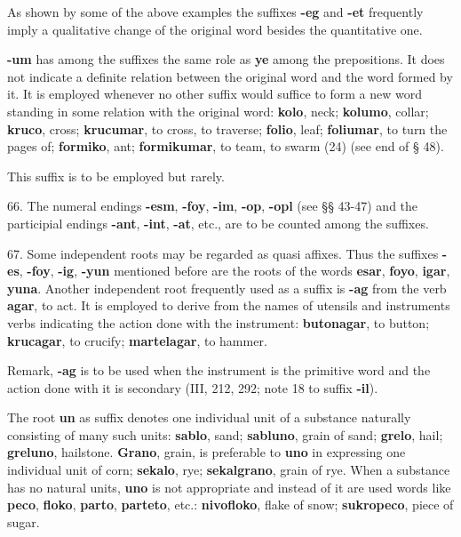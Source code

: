 As shown by some of the above examples the suffixes \textbf{-eg} and \textbf{-et} frequently imply a qualitative change of the original word besides the quantitative one. 

\textbf{-um} has among the suffixes the same role as \textbf{ye} among the prepositions. It does not indicate a definite relation between the original word and the word formed by it. It is employed whenever no other suffix would suffice to form a new word standing in some relation with the original word: \textbf{kolo}, neck; \textbf{kolumo}, collar; \textbf{kruco}, cross; \textbf{krucumar}, to cross, to traverse; \textbf{folio}, leaf; \textbf{foliumar}, to turn the pages of; \textbf{formiko}, ant; \textbf{formikumar}, to team, to swarm (24) (see end of § 48). 

This suffix is to be employed but rarely. 

66. The numeral endings \textbf{-esm}, \textbf{-foy}, \textbf{-im}, \textbf{-op}, \textbf{-opl } (see §§ 43-47) and the participial endings \textbf{-ant}, \textbf{-int}, \textbf{-at}, etc., are to be counted among the suffixes.

67. Some independent roots may be regarded as quasi affixes. Thus the suffixes \textbf{-es}, \textbf{-foy}, \textbf{-ig}, \textbf{-yun} mentioned before are the roots of the words \textbf{esar}, \textbf{foyo}, \textbf{igar}, \textbf{yuna}. Another independent root frequently used as a suffix is \textbf{-ag} from the verb \textbf{agar}, to act. It is employed to derive from the names of utensils and instruments verbs indicating the action done with the instrument: \textbf{butonagar}, to button; \textbf{krucagar}, to crucify; \textbf{martelagar}, to hammer.

\small Remark, \textbf{-ag} is to be used when the instrument is the primitive word and the action done with it is secondary (III, 212, 292; note 18 to suffix \textbf{-il}). \normalsize

The root \textbf{un} as suffix denotes one individual unit of a substance naturally consisting of many such units: \textbf{sablo}, sand; \textbf{sabluno}, grain of sand; \textbf{grelo}, hail; \textbf{greluno}, hailstone. \textbf{Grano}, grain, is preferable to \textbf{uno} in expressing one individual unit of corn; \textbf{sekalo}, rye; \textbf{sekalgrano}, grain of rye. When a substance has no natural units, \textbf{uno} is not appropriate and instead of it are used words like \textbf{peco}, \textbf{floko}, \textbf{parto}, \textbf{parteto}, etc.: \textbf{nivofloko}, flake of snow; \textbf{sukropeco}, piece of sugar. 

